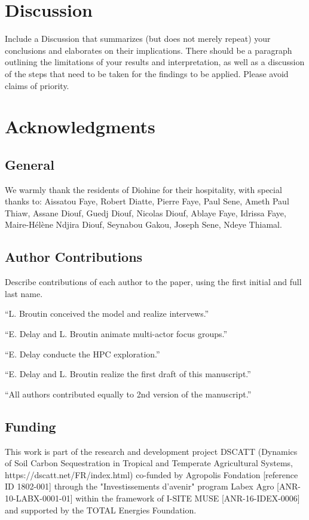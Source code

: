 \documentclass{article}
\begin{document}
\section{Discussion}
Include a Discussion that summarizes (but does not merely repeat) your conclusions and elaborates on their implications. There should be a paragraph outlining the limitations of your results and interpretation, as well as a discussion of the steps that need to be taken for the findings to be applied. Please avoid claims of priority. 

\section*{Acknowledgments}

\subsection*{General} 
We warmly thank the residents of Diohine for their hospitality, with special thanks to: Aissatou Faye, Robert Diatte, Pierre Faye, Paul Sene, Ameth Paul Thiaw, Assane Diouf, Guedj Diouf, Nicolas Diouf, Ablaye Faye, Idrissa Faye, Maire-Hélène Ndjira Diouf, Seynabou Gakou, Joseph Sene, Ndeye Thiamal.

\subsection*{Author Contributions} 
Describe contributions of each author to the paper, using the first initial and full last name. 

``L. Broutin conceived the model and realize intervews.''

``E. Delay and L. Broutin animate multi-actor focus groups.''

``E. Delay conducte the HPC exploration.''

``E. Delay and L. Broutin realize the first draft of this manuscript.''

``All authors contributed equally to 2nd version of the manuscript.''

\subsection*{Funding}

This work is part of the research and development project DSCATT (Dynamics of Soil Carbon Sequestration in Tropical and Temperate Agricultural Systems, https://dscatt.net/FR/index.html) co-funded by Agropolis Fondation [reference ID 1802-001] through the "Investissements d'avenir" program Labex Agro [ANR-10-LABX-0001-01] within the framework of I-SITE MUSE [ANR-16-IDEX-0006] and supported by the TOTAL Energies Foundation.
\end{document}

